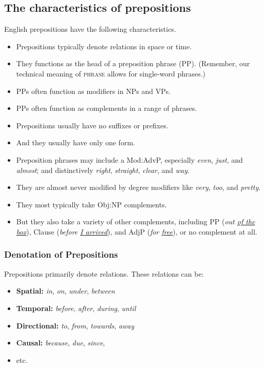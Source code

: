 \subsection{The characteristics of prepositions}\label{sec:preps}

English prepositions have the following characteristics.

\begin{itemize}
    \item Prepositions typically denote relations in space or time.
    \item They functions as the head of a preposition phrase (PP). (Remember, our technical meaning of \textsc{phrase} allows for single-word phrases.)
    \item PPs often function as modifiers in NPs and VPs.
    \item PPs often function as complements in a range of phrases.
    \item Prepositions usually have no suffixes or prefixes.
    \item And they usually have only one form.
    \item Preposition phrases may include a Mod:AdvP, especially \textit{even}, \textit{just}, and \textit{almost}; and distinctively \textit{right}, \textit{straight}, \textit{clear}, and \textit{way}.
    \item They are almost never modified by degree modifiers like \textit{very}, \textit{too}, and \textit{pretty}.
    \item They most typically take Obj:NP complements.
    \item But they also take a variety of other complements, including PP (\textit{out \uline{of the box}}), Clause (\textit{before \uline{I arrived}}), and AdjP (\textit{for \uline{free}}), or no complement at all.
\end{itemize}

\subsubsection*{Denotation of Prepositions}

Prepositions primarily denote relations. These relations can be:

\begin{itemize}
    \item \textbf{Spatial:} \textit{in}, \textit{on}, \textit{under}, \textit{between}
    \item \textbf{Temporal:} \textit{before}, \textit{after}, \textit{during}, \textit{until}
    \item \textbf{Directional:} \textit{to}, \textit{from}, \textit{towards}, \textit{away}
    \item \textbf{Causal:} \textit{because}, \textit{due}, \textit{since},
    \item etc.
\end{itemize}

